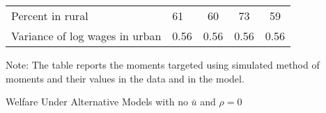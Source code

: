 \documentclass[12pt,pdftex]{article}
\renewcommand{\arraystretch}{1.1}
\begin{document}
\begin{onehalfspacing}
\begin{table}[!htb]
\begin{center}
\begin{tabular}{l l c c c}
Percent in rural                                                & \phantom{0.}61    & \phantom{0.}60    & \phantom{0.}73    & \phantom{0.}59 \\
Variance of log wages in urban                                  & 0.56              & 0.56              &  0.56             &   0.56             \\
\hline
\hline
\end{tabular}
\parbox[c]{6.5in}{%
{\footnotesize  \vspace{0.3cm} Note: The table reports the moments targeted using simulated method of moments and their values in the data and in the model.}
}
\end{center}
\end{table}

\begin{table}[!htb]
\setlength {\tabcolsep}{1.45mm}
\renewcommand{\arraystretch}{1.2}
\begin{center}
\caption{Welfare Under Alternative Models with no $\bar{u}$ and $\rho=0$}

\vspace{0.3cm}


\end{center}
\end{table}
\end{onehalfspacing}
\end{document}
